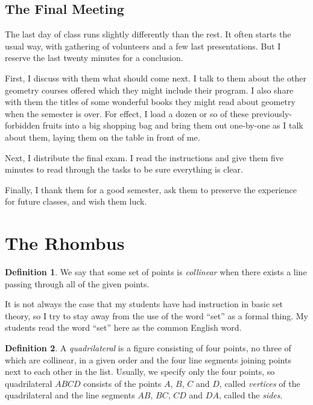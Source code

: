 \documentclass{tufte-handout}
\theoremstyle{definition}
\newtheorem*{definition}{Definition}
\begin{document}
\subsection{The Final Meeting}

The last day of class runs slightly differently than the rest. It often starts the usual way, with gathering of volunteers and a few last presentations. But I reserve the last twenty minutes for a conclusion.

First, I discuss with them what should come next. I talk to them about the other geometry courses offered which they might include their program. I also share with them the titles of some wonderful books they might read about geometry when the semester is over. For effect, I load a dozen or so of these previously-forbidden fruits into a big shopping bag and bring them out one-by-one as I talk about them, laying them on the table in front of me.

Next, I distribute the final exam. I read the instructions and give them five minutes to read through the tasks to be sure everything is clear. 

Finally, I thank them for a good semester, ask them to preserve the experience for future classes, and wish them luck.

\clearpage
\setcounter{section}{1}
\section{The Rhombus}

\begin{definition}
\label{defn:collinear}
We say that some set of points is \emph{collinear} when there exists a line passing through all of the given points.
\end{definition}

It is not always the case that my students have had instruction in basic set theory, so I try to stay away from the use of the word ``set'' as a formal thing. My students read the word ``set'' here as the common English word.


\begin{definition}\label{defn:quadrilateral}
A \emph{quadrilateral} is a figure consisting of four points, no three of which are collinear, in a given order and the four line segments joining points next to each other in the list.
Usually, we specify only the four points, so quadrilateral $ABCD$ consists of the points $A$, $B$, $C$ and $D$, called \emph{vertices} of the quadrilateral and the line segments $AB$, $BC$, $CD$ and $DA$, called the \emph{sides}.
\end{definition}
\end{document}
